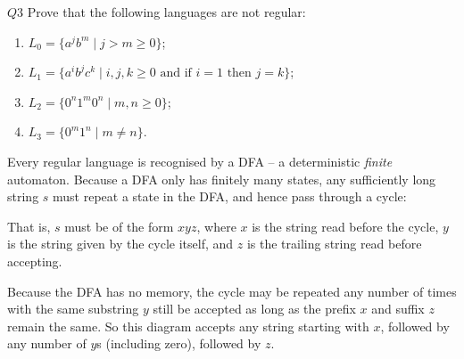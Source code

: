 \documentclass{article}
\theoremstyle{definition}
\theoremstyle{definition}
\theoremstyle{remark}
\begin{document}
\begin{questionbox}{$Q3$}
    Prove that the following languages are not regular:
    \begin{enumerate}
        \item[$(i)$] $L_0=\{a^jb^m\mid j>m\geq0\}$;
        
        \item[$(ii)$] $L_1=\{a^ib^jc^k\mid i,j,k\geq0\text{ and if }i=1\text{ then }j=k\}$;
    
        \item[$(iii)$] $L_2=\{0^n1^m0^n\mid m,n\geq0\}$;
    
        \item[$(iv)$] $L_3=\{0^m1^n\mid m\neq n\}$.
    \end{enumerate}
\end{questionbox}

\bigskip




Every regular language is recognised by a DFA -- a deterministic \textit{finite} automaton. Because a DFA only has finitely many states, any sufficiently long string $s$ must repeat a state in the DFA, and hence pass through a cycle:
\begin{center}
\end{center}
That is, $s$ must be of the form $xyz$, where $x$ is the string read before the cycle, $y$ is the string given by the cycle itself, and $z$ is the trailing string read before accepting.

Because the DFA has no memory, the cycle may be repeated any number of times with the same substring $y$ still be accepted as long as the prefix $x$ and suffix $z$ remain the same. So this diagram accepts any string starting with $x$, followed by any number of $y$s (including zero), followed by $z$.
\end{document}
